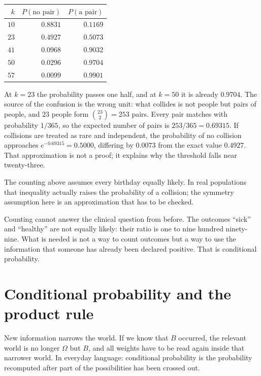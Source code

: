 
\begin{center}
\small
\begin{tabular}{rrr}
\hline
$k$ & $P(\text{no pair})$ & $P(\text{a pair})$ \\
\hline
$10$ & $0.8831$ & $0.1169$ \\
$23$ & $0.4927$ & $0.5073$ \\
$41$ & $0.0968$ & $0.9032$ \\
$50$ & $0.0296$ & $0.9704$ \\
$57$ & $0.0099$ & $0.9901$ \\
\hline
\end{tabular}
\end{center}

At $k=23$ the probability passes one half, and at $k=50$ it is already $0.9704$. The source
of the confusion is the wrong unit: what collides is not people but pairs of people, and
$23$ people form $\binom{23}{2}=253$ pairs. Every pair matches with probability $1/365$, so
the expected number of pairs is $253/365=0.69315$. If collisions are treated as rare and
independent, the probability of no collision approaches $e^{-0.69315}=0.5000$, differing by
$0.0073$ from the exact value $0.4927$. That approximation is not a proof; it explains why
the threshold falls near twenty-three.

The counting above assumes every birthday equally likely. In real populations that
inequality actually raises the probability of a collision; the symmetry assumption here is
an approximation that has to be checked.

Counting cannot answer the clinical question from before. The outcomes ``sick'' and
``healthy'' are not equally likely: their ratio is one to nine hundred ninety-nine. What is
needed is not a way to count outcomes but a way to use the information that someone has
already been declared positive. That is conditional probability.

\section{Conditional probability and the product rule}

New information narrows the world. If we know that $B$ occurred, the relevant world is no
longer $\Omega$ but $B$, and all weights have to be read again inside that narrower world.
In everyday language: conditional probability is the probability recomputed after part of
the possibilities has been crossed out.


